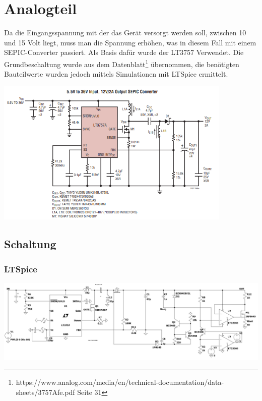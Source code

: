 \documentclass[paper=a4, 12pt]{scrreprt}
\begin{document}
	\section{Analogteil}
	Da die Eingangsspannung mit der das Gerät versorgt werden soll, zwischen 10 und 15 Volt liegt, muss man die Spannung erhöhen, was in diesem Fall mit einem SEPIC-Converter passiert. Als Basis dafür wurde der LT3757 Verwendet.\hfill \break
	Die Grundbeschaltung wurde aus dem Datenblatt\footnote{https://www.analog.com/media/en/technical-documentation/data-sheets/3757Afe.pdf Seite 31} übernommen, die benötigten Bauteilwerte wurden jedoch mittels Simulationen mit LTSpice ermittelt. 
	\begin{adjustbox}{center,caption={Referenzschaltung für SEPIC}, label={fig:LTSpice-Schaltung-Analogteil},nofloat=figure,vspace=\bigskipamount}
		\includegraphics[height=7cm]{img/Referenzschaltung_SEPIC.PNG}
	\end{adjustbox}
	
		\subsection{Schaltung}
			\subsubsection{LTSpice}
			\begin{adjustbox}{center,caption={Simulationsschaltung des Analogteils in LTSpice},label={fig:LTSpice-Schaltung-Analogteil},nofloat=figure,vspace=\bigskipamount}
				\includegraphics[width=\textwidth]{img/LTSpice_Schaltung_Analogteil.PNG}
			\end{adjustbox}
			\pagebreak
\end{document}
